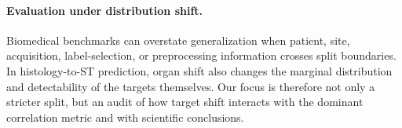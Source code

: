 \paragraph{Evaluation under distribution shift.}
Biomedical benchmarks can overstate generalization when patient, site, acquisition, label-selection,
or preprocessing information crosses split boundaries. In histology-to-ST prediction, organ shift
also changes the marginal distribution and detectability of the targets themselves. Our focus is
therefore not only a stricter split, but an audit of how target shift interacts with the dominant
correlation metric and with scientific conclusions.

